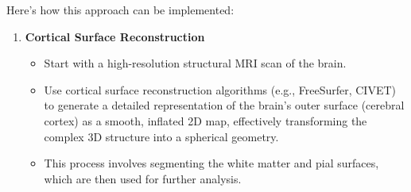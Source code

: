 \documentclass[twocolumn]{article}
\begin{document}
Here's how this approach can be implemented:
\begin{enumerate}
\item \textbf{Cortical Surface Reconstruction}
\begin{itemize}
\item Start with a high-resolution structural MRI scan of the brain.
\item Use cortical surface reconstruction algorithms (e.g., FreeSurfer, CIVET) to generate a detailed
representation of the brain's outer surface (cerebral cortex) as a smooth, inflated 2D map, effectively transforming the complex 3D structure into a spherical geometry.
\item This process involves segmenting the white matter and pial surfaces, which are then used for further analysis.
\end{itemize}


\end{enumerate}
\end{document}
